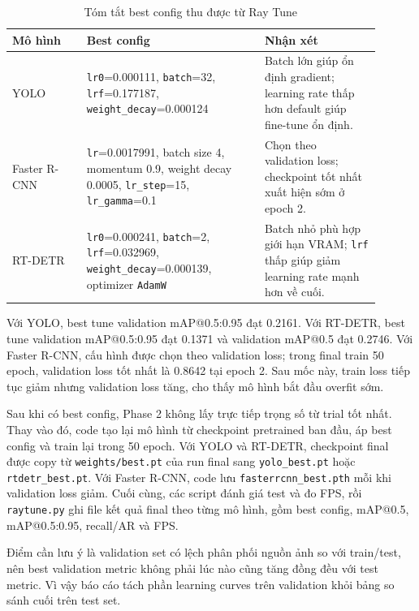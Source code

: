\begin{table}[H]
    \centering
    \caption*{Tóm tắt best config thu được từ Ray Tune}
    \small
    \begin{tabular}{@{}p{0.18\linewidth} p{0.43\linewidth} p{0.29\linewidth}@{}}
        \toprule
        \textbf{Mô hình} & \textbf{Best config} & \textbf{Nhận xét} \\
        \midrule
        YOLO & \texttt{lr0}=0.000111, \texttt{batch}=32, \texttt{lrf}=0.177187, \texttt{weight\_decay}=0.000124 & Batch lớn giúp ổn định gradient; learning rate thấp hơn default giúp fine-tune ổn định. \\
        Faster R-CNN & \texttt{lr}=0.0017991, batch size 4, momentum 0.9, weight decay 0.0005, \texttt{lr\_step}=15, \texttt{lr\_gamma}=0.1 & Chọn theo validation loss; checkpoint tốt nhất xuất hiện sớm ở epoch 2. \\
        RT-DETR & \texttt{lr0}=0.000241, \texttt{batch}=2, \texttt{lrf}=0.032969, \texttt{weight\_decay}=0.000139, optimizer \texttt{AdamW} & Batch nhỏ phù hợp giới hạn VRAM; \texttt{lrf} thấp giúp giảm learning rate mạnh hơn về cuối. \\
        \bottomrule
    \end{tabular}
\end{table}

Với YOLO, best tune validation mAP@0.5:0.95 đạt 0.2161. Với RT-DETR, best tune validation mAP@0.5:0.95 đạt 0.1371 và validation mAP@0.5 đạt 0.2746. Với Faster R-CNN, cấu hình được chọn theo validation loss; trong final train 50 epoch, validation loss tốt nhất là 0.8642 tại epoch 2. Sau mốc này, train loss tiếp tục giảm nhưng validation loss tăng, cho thấy mô hình bắt đầu overfit sớm.

Sau khi có best config, Phase 2 không lấy trực tiếp trọng số từ trial tốt nhất. Thay vào đó, code tạo lại mô hình từ checkpoint pretrained ban đầu, áp best config và train lại trong 50 epoch. Với YOLO và RT-DETR, checkpoint final được copy từ \texttt{weights/best.pt} của run final sang \texttt{yolo\_best.pt} hoặc \texttt{rtdetr\_best.pt}. Với Faster R-CNN, code lưu \texttt{fasterrcnn\_best.pth} mỗi khi validation loss giảm. Cuối cùng, các script đánh giá test và đo FPS, rồi \texttt{raytune.py} ghi file kết quả final theo từng mô hình, gồm best config, mAP@0.5, mAP@0.5:0.95, recall/AR và FPS.

Điểm cần lưu ý là validation set có lệch phân phối nguồn ảnh so với train/test, nên best validation metric không phải lúc nào cũng tăng đồng đều với test metric. Vì vậy báo cáo tách phần learning curves trên validation khỏi bảng so sánh cuối trên test set.

